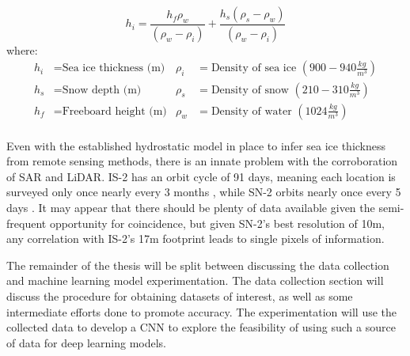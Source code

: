 \begin{equation}
	\label{eq:isostatic-equilibrium}
	\displaystyle h_i=\frac{\displaystyle h_f\rho_w}{(\rho_w-\rho_i)}+\frac{\displaystyle h_s(\rho_s-\rho_w)}{(\rho_w-\rho_i)}
\end{equation}
where:
\begin{align*}
 \displaystyle h_i    &=  \text{Sea ice thickness (m)} &  \rho_i 						&=  \text{Density of sea ice }(900-940 \frac{kg}{m^3}) \\   %
 \displaystyle h_s   	&=  \text{Snow depth (m)} 		 & 		\rho_s							&=  \text{Density of snow }(210-310 \frac{kg}{m^3}) \\   %
 \displaystyle h_f    &=  \text{Freeboard height (m)}  & 	\rho_w 						&=  \text{Density of water }(1024 \frac{kg}{m^3}) \\   %
\end{align*}

Even with the established hydrostatic model in place to infer sea ice thickness from remote sensing methods, there is an innate problem with the corroboration of SAR and LiDAR. IS-2 has an orbit cycle of 91 days, meaning each location is surveyed only once nearly every 3 months \cite{ICESat-2-ATL10-Product}, while SN-2 orbits nearly once every 5 days \cite{copernicusSentinel2Missions}. It may appear that there should be plenty of data available given the semi-frequent opportunity for coincidence, but given SN-2's best resolution of 10m, any correlation with IS-2's 17m footprint leads to single pixels of information.


The remainder of the thesis will be split between discussing the data collection and machine learning model experimentation. The data collection section will discuss the procedure for obtaining datasets of interest, as well as some intermediate efforts done to promote accuracy. The  experimentation will use the collected data to develop a CNN to explore the feasibility of using such a source of data for deep learning models.